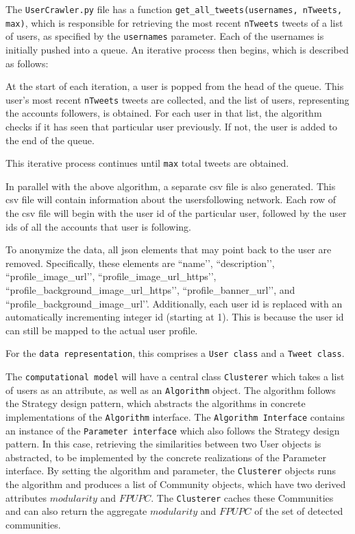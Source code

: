 The \texttt{UserCrawler.py} file has a function \texttt{get\_all\_tweets(usernames, nTweets, max)}, which is responsible for retrieving the most recent \texttt{nTweets} tweets of a list of users, as specified by the \texttt{usernames} parameter. Each of the usernames is initially pushed into a queue. An iterative process then begins, which is described as follows:




At the start of each iteration, a user is popped from the head of the queue. This user’s most recent \texttt{nTweets} tweets are collected, and the list of users, representing the account\vtick s followers, is obtained. For each user in that list, the algorithm checks if it has seen that particular user previously. If not, the user is added to the end of the queue.




This iterative process continues until \texttt{max} total tweets are obtained.




In parallel with the above algorithm, a separate csv file is also generated. This csv file will contain information about the users\vtick following network. Each row of the csv file will begin with the user id of the particular user, followed by the user id\vtick s of all the accounts that user is following.




To anonymize the data, all json elements that may point back to the user are removed. Specifically, these elements are ``name’’, ``description’’, ``profile\_image\_url’’, ``profile\_image\_url\_https’’, ``profile\_background\_image\_url\_https’’, ``profile\_banner\_url’’, and ``profile\_background\_image\_url’’. Additionally, each user id is replaced with an automatically incrementing integer id (starting at 1). This is because the user id can still be mapped to the actual user profile.




For the \texttt{data representation}, this comprises a \texttt{User class} and a \texttt{Tweet class}.


The \texttt{computational model} will have a central class \texttt{Clusterer} which takes a list of users as an attribute, 
as well as an \texttt{Algorithm} object. The algorithm follows the Strategy design pattern, which abstracts the algorithms in
concrete implementations of the \texttt{Algorithm} interface. The \texttt{Algorithm Interface} contains an instance of the \texttt{Parameter interface}
which also follows the Strategy design pattern. In this case, retrieving the similarities between two User objects is abstracted,
to be implemented by the concrete realizations of the Parameter interface. By setting the algorithm and parameter, the \texttt{Clusterer} objects 
runs the algorithm and produces a list of Community objects, which have two derived attributes $modularity$ and $FPUPC$. The \texttt{Clusterer} caches
these Communities and can also return the aggregate $modularity$ and $FPUPC$ of the set of detected communities.


